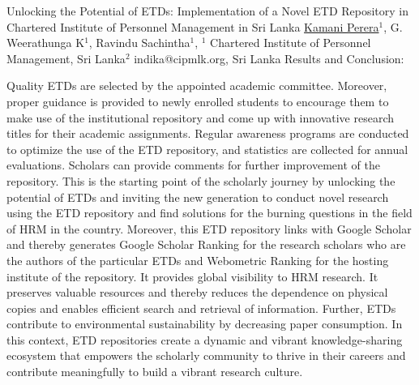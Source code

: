 \begin{abstract_online}{Unlocking the Potential of ETDs: Implementation of a Novel ETD Repository in Chartered Institute of Personnel Management in Sri Lanka}{%
    \underline{Kamani Perera}$^{1}$, G. Weerathunga K$^{1}$, Ravindu Sachintha$^{1}$,
}{%
    $^1$ Chartered Institute of Personnel Management, Sri Lanka\newline{}$^2$ indika@cipmlk.org, Sri Lanka}
Results and Conclusion:

Quality ETDs are selected by the appointed academic committee. Moreover, proper guidance is provided to newly enrolled students to encourage them to make use of the institutional repository and come up with innovative research titles for their academic assignments. Regular awareness programs are conducted to optimize the use of the ETD repository, and statistics are collected for annual evaluations. Scholars can provide comments for further improvement of the repository. This is the starting point of the scholarly journey by unlocking the potential of ETDs and inviting the new generation to conduct novel research using the ETD repository and find solutions for the burning questions in the field of HRM in the country. Moreover, this ETD repository links with Google Scholar and thereby generates Google Scholar Ranking for the research scholars who are the authors of the particular ETDs and Webometric Ranking for the hosting institute of the repository. It provides global visibility to HRM research. It preserves valuable resources and thereby reduces the dependence on physical copies and enables efficient search and retrieval of information. Further, ETDs contribute to environmental sustainability by decreasing paper consumption. In this context, ETD repositories create a dynamic and vibrant knowledge-sharing ecosystem that empowers the scholarly community to thrive in their careers and contribute meaningfully to build a vibrant research culture.

\end{abstract_online}

